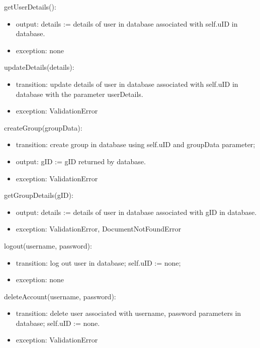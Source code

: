 \documentclass[12pt, titlepage]{article}
\begin{document}
\noindent getUserDetails():
\begin{itemize}
\item output: details := details of user in database associated with self.uID in database.
\item exception: none
\end{itemize}

\noindent updateDetails(details):
\begin{itemize}
\item transition: update details of user in database associated with self.uID in database with the parameter userDetails.
\item exception: ValidationError
\end{itemize}

\noindent createGroup(groupData):
\begin{itemize}
\item transition: create group in database using self.uID and groupData parameter;
\item output: gID := gID returned by database.
\item exception: ValidationError
\end{itemize}

\noindent getGroupDetails(gID):
\begin{itemize}
\item output: details := details of user in database associated with gID in database.
\item exception: ValidationError, DocumentNotFoundError
\end{itemize}

\noindent logout(username, password):
\begin{itemize}
\item transition: log out user in database; self.uID := none;
\item exception: none
\end{itemize}

\noindent deleteAccount(username, password):
\begin{itemize}
\item transition: delete user associated with username, password parameters in database; self.uID := none.
\item exception: ValidationError
\end{itemize}

\end{document}
